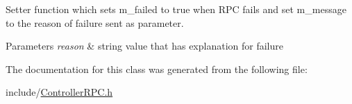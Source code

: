 Setter function which sets m\+\_\+failed to true when R\+PC fails and set m\+\_\+message to the reason of failure sent as parameter. 


\begin{DoxyParams}{Parameters}
{\em reason} & string value that has explanation for failure \\
\hline
\end{DoxyParams}


The documentation for this class was generated from the following file\+:\begin{DoxyCompactItemize}
\item 
include/\hyperlink{ControllerRPC_8h}{Controller\+R\+P\+C.\+h}\end{DoxyCompactItemize}
